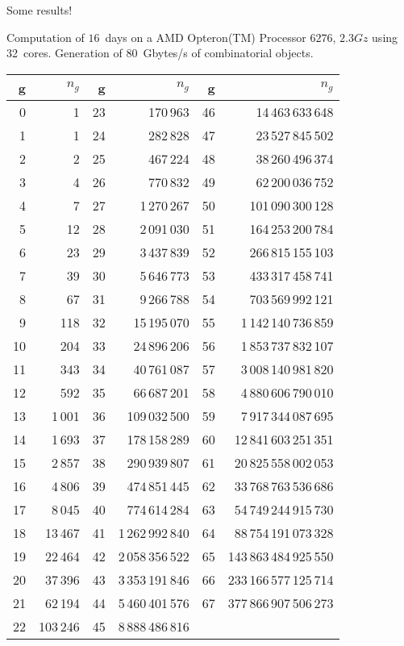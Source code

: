 \documentclass[compress,11pt]{beamer}
\begin{document}
\begin{frame}[fragile]{Some results!}

  Computation of $16$~days on a AMD Opteron(TM) Processor $6276$, $2.3Gz$
  using 32~cores. Generation of $80$~Gbytes/s of combinatorial objects.

\tiny
\begin{center}
\begin{tabular}{|r|r||r|r||r|r|}
\hline
g & $n_g$ & g & $n_g$ & g & $n_g$ \\
\hline
0 & 1 & 23 & 170\,963 & 46 & 14\,463\,633\,648\\
1 & 1 & 24 & 282\,828 & 47 & 23\,527\,845\,502\\
2 & 2 & 25 & 467\,224 & 48 & 38\,260\,496\,374\\
3 & 4 & 26 & 770\,832 & 49 & 62\,200\,036\,752\\
4 & 7 & 27 & 1\,270\,267 & 50 & 101\,090\,300\,128\\
5 & 12 & 28 & 2\,091\,030 & 51 & 164\,253\,200\,784\\
6 & 23 & 29 & 3\,437\,839 & 52 & 266\,815\,155\,103\\
7 & 39 & 30 & 5\,646\,773 & 53 & 433\,317\,458\,741\\
8 & 67 & 31 & 9\,266\,788 & 54 & 703\,569\,992\,121\\
9 & 118 & 32 & 15\,195\,070 & 55 & 1\,142\,140\,736\,859\\
10 & 204 & 33 & 24\,896\,206 & 56 & 1\,853\,737\,832\,107\\
11 & 343 & 34 & 40\,761\,087 & 57 & 3\,008\,140\,981\,820\\
12 & 592 & 35 & 66\,687\,201 & 58 & 4\,880\,606\,790\,010\\
13 & 1\,001 & 36 & 109\,032\,500 & 59 & 7\,917\,344\,087\,695\\
14 & 1\,693 & 37 & 178\,158\,289 & 60 & 12\,841\,603\,251\,351\\
15 & 2\,857 & 38 & 290\,939\,807 & 61 & 20\,825\,558\,002\,053\\
16 & 4\,806 & 39 & 474\,851\,445 & 62 & 33\,768\,763\,536\,686\\
17 & 8\,045 & 40 & 774\,614\,284 & 63 & 54\,749\,244\,915\,730\\
18 & 13\,467 & 41 & 1\,262\,992\,840 & 64 & 88\,754\,191\,073\,328\\
19 & 22\,464 & 42 & 2\,058\,356\,522 & 65 & 143\,863\,484\,925\,550\\
20 & 37\,396 & 43 & 3\,353\,191\,846 & 66 & 233\,166\,577\,125\,714\\
21 & 62\,194 & 44 & 5\,460\,401\,576 & 67 & 377\,866\,907\,506\,273\\
22 & 103\,246 & 45 & 8\,888\,486\,816 & &\\
\hline
\end{tabular}
\end{center}
\end{frame}
\end{document}
